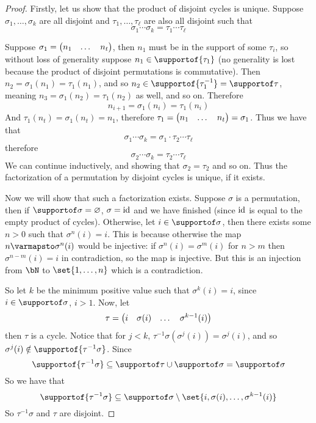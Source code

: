 \begin{proof}

    Firstly, let us show that the product of disjoint cycles is unique.
    Suppose $\sigma_1,\dots,\sigma_k$ are all disjoint and $\tau_1,\dots,\tau_\ell$ are also all disjoint such that
    \[ \sigma_1\cdots\sigma_k = \tau_1\cdots\tau_\ell \]

    Suppose $\sigma_1=\begin{pmatrix}n_1&\dots&n_t\end{pmatrix}$, then $n_1$ must be in the support of some $\tau_i$, so without loss of generality suppose $n_1\in\supportof{\tau_1}$ (no generality is lost because the product
    of disjoint permutations is commutative).
    Then $n_2=\sigma_1(n_1)=\tau_1(n_1)$, and so $n_2\in\supportof{\tau_1^{-1}}=\supportof\tau$, meaning $n_3=\sigma_1(n_2)=\tau_1(n_2)$ as well, and so on.
    Therefore
    \[ n_{i+1} = \sigma_1(n_i) = \tau_1(n_i) \]
    And $\tau_1(n_t)=\sigma_1(n_t)=n_1$, therefore $\tau_1=\begin{pmatrix}n_1&\dots&n_t\end{pmatrix}=\sigma_1$.
    Thus we have that
    \[ \sigma_1\cdots\sigma_k=\sigma_1\cdot\tau_2\cdots\tau_\ell \]
    therefore
    \[ \sigma_2\cdots\sigma_k = \tau_2\cdots\tau_\ell \]
    We can continue inductively, and showing that $\sigma_2=\tau_2$ and so on.
    Thus the factorization of a permutation by disjoint cycles is unique, if it exists.

    Now we will show that such a factorization exists.
    Suppose $\sigma$ is a permutation, then if $\supportof\sigma=\varnothing$, $\sigma=\mathrm{id}$ and we have finished (since $\mathrm{id}$ is equal to the empty product of cycles).
    Otherwise, let $i\in\supportof\sigma$, then there exists some $n>0$ such that $\sigma^n(i)=i$.
    This is because otherwise the map $n\varmapsto\sigma^n(i)$ would be injective: if $\sigma^n(i)=\sigma^m(i)$ for $n>m$ then $\sigma^{n-m}(i)=i$ in contradiction, so the map is injective.
    But this is an injection from $\bN$ to $\set{1,\dots,n}$ which is a contradiction.

    So let $k$ be the minimum positive value such that $\sigma^k(i)=i$, since $i\in\supportof\sigma$, $i>1$.
    Now, let
    \[ \tau = \begin{pmatrix}i&\sigma(i)&\dots&\sigma^{k-1}(i)\end{pmatrix} \]
    then $\tau$ is a cycle.
    Notice that for $j<k$, $\tau^{-1}\sigma(\sigma^j(i))=\sigma^j(i)$, and so $\sigma^j(i)\notin\supportof{\tau^{-1}\sigma}$.
    Since
    \[ \supportof{\tau^{-1}\sigma}\subseteq\supportof\tau\cup\supportof\sigma=\supportof\sigma \]
    So we have that
    \[ \supportof{\tau^{-1}\sigma}\subseteq\supportof\sigma\setminus\set{i,\sigma(i),\dots,\sigma^{k-1}(i)} \]
    So $\tau^{-1}\sigma$ and $\tau$ are disjoint.


\end{proof}
